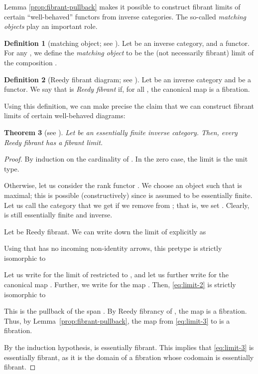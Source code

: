 \documentclass[a4paper,reqno]{amsart}
\theoremstyle{plain}
\newtheorem{theorem}{Theorem}[section]
\theoremstyle{definition}
\newtheorem{definition}[theorem]{Definition}
\begin{document}
Lemma \ref{prop:fibrant-pullback} makes it possible to construct fibrant limits of
certain ``well-behaved'' functors from inverse categories.
The so-called \emph{matching objects} play an important role.
\begin{definition}[matching object; see {\cite[Chp.~11]{shulman_inversediagrams}}]
Let  be an inverse category, and  a functor. 
For any , we define the \emph{matching object}  to be the (not necessarily fibrant) limit of
the composition
.
\end{definition}


\begin{definition}[Reedy fibrant diagram; see {\cite[Def. 11.3]{shulman_inversediagrams}}]
 Let  be an inverse category and  be a functor.
 We say that  is \emph{Reedy fibrant} if, for all , the canonical map  is a fibration.
\end{definition}



Using this definition, we can make precise the claim that we can construct fibrant limits of certain well-behaved diagrams:
\begin{theorem}[see {\cite[Lemma 11.8]{shulman_inversediagrams}}] \label{thm:fibrant-limits}
Let  be an essentially finite inverse category. 
Then, every Reedy fibrant  has a fibrant limit.
\end{theorem}
\begin{proof}
By induction on the cardinality of . In the zero case, the limit is the unit type.

 Otherwise, let us consider the rank functor .
 We choose an object  such that  is maximal; this is possible (constructively) since  is assumed to be essentially finite.
 Let us call  the category that we get if we remove  from ; 
 that is, we set .
 Clearly,  is still essentially finite and inverse.
 
 Let  be Reedy fibrant. 
 We can write down the limit of  
 explicitly as
 
 Using that  has no incoming non-identity arrows, this pretype is strictly isomorphic to
 

 
 Let us write  for the limit of  restricted to ,
 and let us further write  for the canonical map . 
 Further, we write  for the map .
 Then, \eqref{eq:limit-2} is strictly isomorphic to
 
 This is the pullback of the span .
 By Reedy fibrancy of , the map  is a fibration. 
 Thus, by Lemma~\ref{prop:fibrant-pullback}, the map from \eqref{eq:limit-3} to  is a fibration.

 By the induction hypothesis,  is essentially fibrant.
 This implies that \eqref{eq:limit-3} is essentially fibrant, as it is the domain of a fibration whose codomain is essentially fibrant.
\end{proof}
\end{document}
